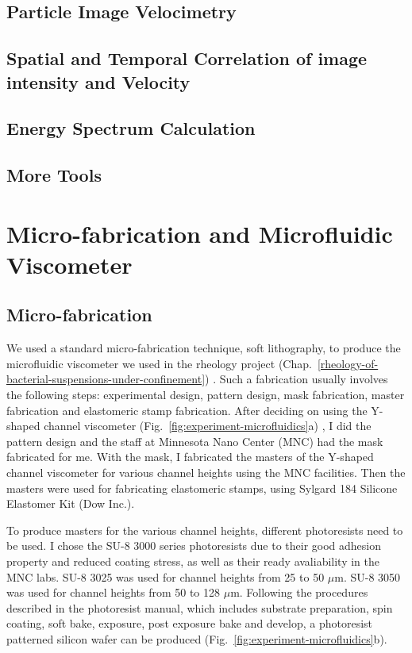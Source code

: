 \subsection{Particle Image Velocimetry}

\subsection{Spatial and Temporal Correlation of image intensity and Velocity}

\subsection{Energy Spectrum Calculation}

\subsection{More Tools}


\section{Micro-fabrication and Microfluidic Viscometer}
\label{micro-fabrication-and-microfluidics}

\subsection{Micro-fabrication}

We used a standard micro-fabrication technique, soft lithography, to produce the microfluidic viscometer we used in the rheology project (Chap.~\ref{rheology-of-bacterial-suspensions-under-confinement}) \cite{Qin2010}. Such a fabrication usually involves the following steps: experimental design, pattern design, mask fabrication, master fabrication and elastomeric stamp fabrication.
After deciding on using the Y-shaped channel viscometer (Fig.~\ref{fig:experiment-microfluidics}a) \cite{Gachelin2013}, I did the pattern design and the staff at Minnesota Nano Center (MNC) had the mask fabricated for me. With the mask, I fabricated the masters of the Y-shaped channel viscometer for various channel heights using the MNC facilities. Then the masters were used for fabricating elastomeric stamps, using Sylgard 184 Silicone Elastomer Kit (Dow Inc.).

To produce masters for the various channel heights, different photoresists need to be used. I chose the SU-8 3000 series photoresists due to their good adhesion property and reduced coating stress, as well as their ready avaliability in the MNC labs. SU-8 3025 was used for channel heights from 25 to 50 $\mu$m. SU-8 3050 was used for channel heights from 50 to 128 $\mu$m. Following the procedures described in the photoresist manual, which includes substrate preparation, spin coating, soft bake, exposure, post exposure bake and develop, a photoresist patterned silicon wafer can be produced (Fig.~\ref{fig:experiment-microfluidics}b).

